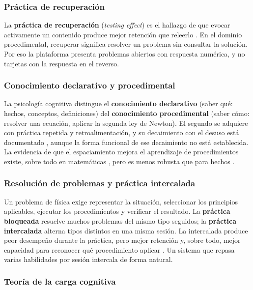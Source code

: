 \documentclass[12pt]{article}
\theoremstyle{definition}
\begin{document}
\subsubsection{Práctica de recuperación}

La \textbf{práctica de recuperación} (\emph{testing effect}) es el hallazgo de que evocar activamente un contenido produce mejor retención que releerlo \citep{kang2016}. En el dominio procedimental, recuperar significa resolver un problema sin consultar la solución. Por eso la plataforma presenta problemas abiertos con respuesta numérica, y no tarjetas con la respuesta en el reverso.

\subsubsection{Conocimiento declarativo y procedimental}

La psicología cognitiva distingue el \textbf{conocimiento declarativo} (saber qué: hechos, conceptos, definiciones) del \textbf{conocimiento procedimental} (saber cómo: resolver una ecuación, aplicar la segunda ley de Newton). El segundo se adquiere con práctica repetida y retroalimentación, y su decaimiento con el desuso está documentado \citep{arthur1998}, aunque la forma funcional de ese decaimiento no está establecida. La evidencia de que el espaciamiento mejora el aprendizaje de procedimientos existe, sobre todo en matemáticas \citep{rohrer2007,rohrer2015}, pero es menos robusta que para hechos \citep{barzagar2019}.

\subsubsection{Resolución de problemas y práctica intercalada}

Un problema de física exige representar la situación, seleccionar los principios aplicables, ejecutar los procedimientos y verificar el resultado. La \textbf{práctica bloqueada} resuelve muchos problemas del mismo tipo seguidos; la \textbf{práctica intercalada} alterna tipos distintos en una misma sesión. La intercalada produce peor desempeño durante la práctica, pero mejor retención y, sobre todo, mejor capacidad para reconocer qué procedimiento aplicar \citep{rohrer2007,rohrer2015}. Un sistema que repasa varias habilidades por sesión intercala de forma natural.

\subsubsection{Teoría de la carga cognitiva}
\end{document}
